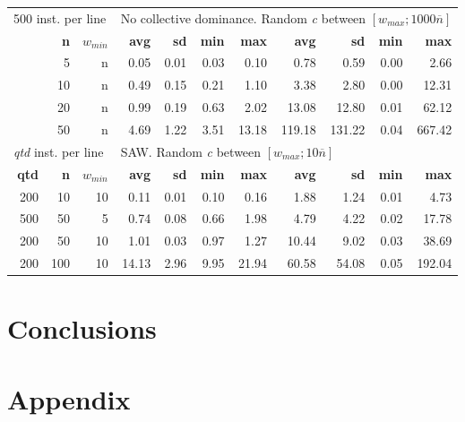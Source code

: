 \documentclass[runningheads,a4paper]{llncs}
\begin{document}
\begin{table}
\begin{tabular}{@{\extracolsep{4pt}}rrrrrrrrrrr@{}}
\multicolumn{3}{l}{500 inst. per line} & \multicolumn{8}{l}{No collective dominance. Random \emph{c} between \([w_{max}; 1000\overline{n}]\)}\\
\cline{1-3}\cline{4-11}
& \textbf{n} & \(w_{min}\) & \textbf{avg} & \textbf{sd} & \textbf{min} & \textbf{max} & \textbf{avg} & \textbf{sd} & \textbf{min} & \textbf{max}\\
\cline{1-3}\cline{4-7}\cline{8-11}
&  5 & n & 0.05 & 0.01 & 0.03 & 0.10 & 0.78 & 0.59 & 0.00 & 2.66\\
& 10 & n & 0.49 & 0.15 & 0.21 & 1.10 & 3.38 & 2.80 & 0.00 & 12.31\\
& 20 & n & 0.99 & 0.19 & 0.63 & 2.02 & 13.08 & 12.80 & 0.01 & 62.12\\
& 50 & n & 4.69 & 1.22 & 3.51 & 13.18 & 119.18 & 131.22 & 0.04 & 667.42\\
\hline

\multicolumn{3}{l}{\emph{qtd} inst. per line} & \multicolumn{8}{l}{SAW. Random \emph{c} between \([w_{max}; 10\overline{n}]\)}\\
\cline{1-3}\cline{4-11}
\textbf{qtd} & \textbf{n} & \(w_{min}\) & \textbf{avg} & \textbf{sd} & \textbf{min} & \textbf{max} & \textbf{avg} & \textbf{sd} & \textbf{min} & \textbf{max}\\
\cline{1-3}\cline{4-7}\cline{8-11}
~200 &  10 & 10 & 0.11 & 0.01 & 0.10 & 0.16 & 1.88 & 1.24 & 0.01 & 4.73\\
~500 &  50 &  5 & 0.74 & 0.08 & 0.66 & 1.98 & 4.79 & 4.22 & 0.02 & 17.78\\
~200 &  50 & 10 & 1.01 & 0.03 & 0.97 & 1.27 & 10.44 & 9.02 & 0.03 & 38.69\\
~200 & 100 & 10 & 14.13 & 2.96 & 9.95 & 21.94 & 60.58 & 54.08 & 0.05 & 192.04\\
\hline

\end{tabular}
\end{table}

\section{Conclusions}

\section{Appendix}
\end{document}
